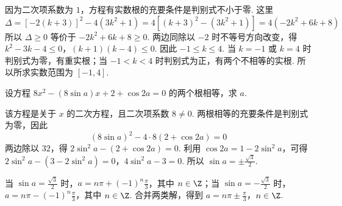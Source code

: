 \documentclass[UTF8,a4paper,oneside,11pt]{ctexbook}
\begin{document}
\begin{solution}
因为二次项系数为 \(1\)，方程有实数根的充要条件是判别式不小于零. 这里
\[
\Delta=\left[-2\left(k+3\right)\right]^2-4\left(3k^2+1\right)
=4\left[\left(k+3\right)^2-\left(3k^2+1\right)\right]
=4\left(-2k^2+6k+8\right)
\]
所以 \(\Delta\geq0\) 等价于 \(-2k^2+6k+8\geq0\). 两边同除以 \(-2\) 时不等号方向改变，得
\(k^2-3k-4\leq0\)，\(\left(k+1\right)\left(k-4\right)\leq0\).
因此 \(-1\leq k\leq4\). 当 \(k=-1\) 或 \(k=4\) 时判别式为零，有重实根；当 \(-1<k<4\) 时判别式为正，有两个不相等的实根. 所以所求实数范围为 \(\left[-1,4\right]\).
\end{solution}

\begin{problem}
设方程 \(8x^2-\left(8\sin a\right)x+2+\cos2a=0\) 的两个根相等，求 \(a\).
\end{problem}

\begin{solution}
该方程是关于 \(x\) 的二次方程，且二次项系数 \(8\neq0\). 两根相等的充要条件是判别式为零，因此
\[
\left(8\sin a\right)^2-4\cdot8\left(2+\cos2a\right)=0
\]
两边除以 \(32\)，得 \(2\sin^2a-\left(2+\cos2a\right)=0\). 利用 \(\cos2a=1-2\sin^2a\)，可得
\(2\sin^2a-\left(3-2\sin^2a\right)=0\)，\(4\sin^2a-3=0\).
所以 \(\sin a=\pm\frac{\sqrt3}{2}\).

当 \(\sin a=\frac{\sqrt3}{2}\) 时，\(a=n\pi+\left(-1\right)^n\frac{\pi}{3}\)，其中 \(n\in\Z\)；当 \(\sin a=-\frac{\sqrt3}{2}\) 时，\(a=n\pi-\left(-1\right)^n\frac{\pi}{3}\)，其中 \(n\in\Z\). 合并两类解，得到
\(a=n\pi\pm\frac{\pi}{3}\)，\(n\in\Z\).
\end{solution}

\end{document}
